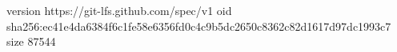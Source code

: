 version https://git-lfs.github.com/spec/v1
oid sha256:ec41e4da6384f6c1fe58e6356fd0c4c9b5dc2650c8362c82d1617d97dc1993c7
size 87544
